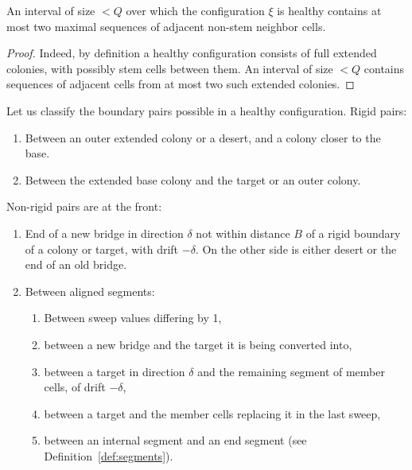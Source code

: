 \documentclass[12pt]{memoir}
\def\B{B}
\begin{document}
\begin{lemma}\label{lem:two-domains}
  An interval of size \( <Q \) over which the configuration \( \xi \) is healthy
contains at most two maximal sequences of adjacent non-stem neighbor cells.
\end{lemma}
\begin{proof}
Indeed, by definition a healthy configuration consists of full extended colonies, with 
possibly stem cells between them.
An interval of size \( <Q \) contains sequences of adjacent cells 
from at most two such extended colonies.
\end{proof}

Let us classify the boundary pairs possible in a healthy configuration.
Rigid pairs:

\begin{enumerate}[label=\upshape{(r\arabic*)}, ref=r\arabic*]
\item\label{i:rigid.outer-workspace}
  Between an outer extended colony or a desert, and a colony closer to the base.
\item\label{i:rigid.bridge-target} Between the extended base colony 
and the target or an outer colony.
\end{enumerate}

Non-rigid pairs are at the front:
\begin{enumerate}[label=(nr\arabic*), ref=nr\arabic*]

  \item\label{i:nr.bridge-bridge} End of a new bridge in direction \( \delta \)
not within distance \( \B \) of a rigid boundary of a colony or target, with drift \( -\delta \).
On the other side is either desert or the end of an old bridge.

  \item\label{i:nr.aligned} Between aligned segments:
    \begin{enumerate}[label=(\arabic*), ref=nr\arabic{enumi}.\arabic*]
     \item\label{i:nr.aligned.differ-1} Between sweep values differing by 1,
     \item\label{i:nr.aligned.bridge-target} between a new bridge and the target it is being converted into,
     \item\label{i:nr.aligned.target-member} 
between a target in direction \( \delta \) and the remaining segment of member cells, of drift \( -\delta \),
     \item\label{i:nr.aligned.member-target}  between a target and the member cells replacing it in the last sweep,
     \item\label{i:nr.aligned.internal-end} 
between an internal segment and an end segment (see Definition~\ref{def:segments}).
    \end{enumerate}

\end{enumerate}
\end{document}
